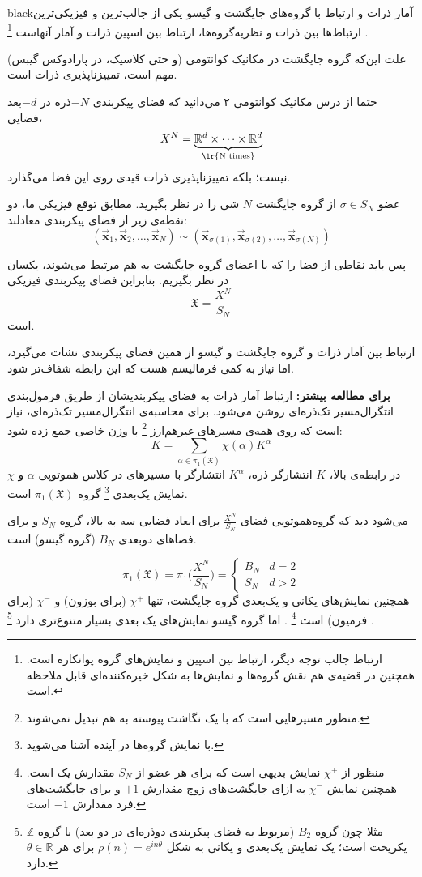 \documentclass{article}
\begin{document}
\begin{boxes}{black}{آمار ذرات و ارتباط با گروه‌های جایگشت و گیسو}
	یکی از جالب‌ترین و فیزیکی‌ترین ارتباط‌ها بین ذرات و نظریه‌گروه‌ها، ارتباط بین اسپین ذرات و آمار آنهاست
	\footnote{ارتباط جالب توجه دیگر، ارتباط بین اسپین و نمایش‌های گروه پوانکاره است.
	همچنین در قضیه‌ی 
	هم نقش گروه‌ها و نمایش‌ها به شکل خیره‌کننده‌ای قابل ملاحظه است.
	}
	.
	
	علت این‌که گروه جایگشت در مکانیک کوانتومی (و حتی کلاسیک، در پارادوکس گیبس) مهم است، تمییزناپذیری ذرات است.
	
	حتما از درس مکانیک کوانتومی ۲ می‌دانید که فضای پیکربندی 
	$-N$ذره
	در $-d$بعد فضایی، 
	\[X^N = \underbrace{\mathbb{R}^d \times \dots \times \mathbb{R}^d}_{\text{\lr{N times}}}\]
	نیست؛ بلکه تمییزناپذیری ذرات قیدی روی این فضا می‌گذارد.
	
	عضو
	$\sigma \in S_N$
	از گروه جایگشت $N$ شی را در نظر بگیرید. مطابق توقع فیزیکی ما، دو نقطه‌ی زیر از فضای پیکربندی معادلند:
	\[
	(\vec{\textbf{x}}_1, \vec{\textbf{x}}_2 , \dots , \vec{\textbf{x}}_N ) \sim (\vec{\textbf{x}}_{\sigma(1)}, \vec{\textbf{x}}_{\sigma(2)} , \dots , \vec{\textbf{x}}_{\sigma(N)} )
	\] 


پس باید نقاطی از فضا را که با اعضای گروه جایگشت به هم مرتبط می‌شوند، یکسان در نظر بگیریم. بنابراین فضای پیکربندی فیزیکی 
\[
\mathfrak{X} = 
\frac{X^N}{S_N}
\]
است.


ارتباط بین آمار ذرات و گروه‌ جایگشت و گیسو از همین فضای پیکربندی نشات می‌گیرد، اما نیاز به کمی فرمالیسم هست که این رابطه‌ شفاف‌تر شود.

\textbf{برای مطالعه بیشتر:}
ارتباط آمار ذرات به فضای پیکربندیشان از طریق فرمول‌بندی انتگرال‌مسیر تک‌ذره‌ای روشن می‌شود. برای محاسبه‌ی انتگرال‌مسیر تک‌ذره‌ای، نیاز است که روی همه‌ی مسیرهای غیرهم‌ارز
\footnote{منظور مسیرهایی است که با یک نگاشت پیوسته به هم تبدیل نمی‌شوند.}
با وزن خاصی جمع زده شود:
\[
K = \sum_{\alpha \in \pi_1(\mathfrak{X})} \chi(\alpha) K^\alpha
\]
در رابطه‌ی بالا، $K$ انتشارگر ذره، $K^\alpha$ انتشارگر با مسیرهای در کلاس هموتوپی $\alpha$ و $\chi$ نمایش یک‌بعدی
\footnote{با نمایش‌ گروه‌ها در آینده آشنا می‌شوید.}
 گروه 
 $\pi_1(\mathfrak{X})$
 است.

می‌شود دید که گروه‌هموتوپی فضای 
$\frac{X^N}{S_N}$
برای ابعاد فضایی سه ‌به بالا، گروه 
$S_N$
و  برای فضاهای دو‌بعدی
$B_N$
(گروه گیسو) است.

\[
\pi_1(\mathfrak{X}) = \pi_1 \big( \frac{X^N}{S_N} \big) = \begin{cases}
	B_N & d=2\\
	S_N & d>2
\end{cases} 
\]
همچنین نمایش‌های یکانی و یک‌بعدی گروه جایگشت، تنها 
$\chi^+$
 (برای بوزون) و
  $\chi^-$
  (‌برای فرمیون) است
\footnote{
	منظور از 
	$\chi^+$
	 نمایش بدیهی است که برای هر عضو از $S_N$ مقدارش یک است. همچنین نمایش 
	 $\chi^-$
	 به ازای جایگشت‌های زوج مقدارش
	 $+1$
	 و برای جایگشت‌های فرد مقدارش 
	 $-1$
	 است.
	}
. اما گروه گیسو نمایش‌های یک بعدی بسیار متنوع‌تری دارد
\footnote{
مثلا چون گروه
$B_2$
(مربوط به فضای ‌پیکربندی دوذره‌ای در دو بعد) با گروه 
$\mathbb{Z}$
یکریخت است؛ یک نمایش یک‌بعدی و یکانی به شکل 
$\rho(n) = e^{in\theta}$
برای هر
$\theta \in \mathbb{R}$
دارد.
}
.



\end{boxes}
\end{document}
